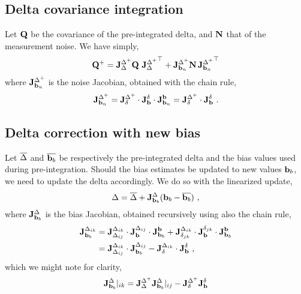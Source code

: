 \subsection{Delta covariance integration}

Let ${\bf Q}$ be the covariance of the pre-integrated delta, and ${\bf N}$ that of the measurement noise. We have simply,
%
\begin{align}
{\bf Q}^+ = {{\bf J}^{\Delta^+}_{\Delta}}{\bf Q}\,\,{{\bf J}^{\Delta^+}_{\Delta}}^{\top} + {{\bf J}^{\Delta^+}_{{\bf b}_n}}{\bf N}\,{{\bf J}^{\Delta^+}_{{\bf b}_n}}^{\top}
\end{align}
%
where ${{\bf J}^{\Delta^+}_{{\bf b}_n}}$ is the noise Jacobian, obtained with the chain rule,
%
\begin{align}
{{\bf J}^{\Delta^+}_{{\bf b}_n}} = {{\bf J}^{\Delta^+}_{\delta}} \cdot {{\bf J}^{\delta}_{{\bf b}}} \cdot {{\bf J}^{{\bf b}}_{{\bf b}_n}} = {{\bf J}^{\Delta^+}_{\delta}} \cdot {{\bf J}^{\delta}_{{\bf b}}}
~.
\end{align}


\subsection{Delta correction with new bias}

Let $\overline{\Delta}$ and $\overline{{\bf b}_b}$ be respectively the pre-integrated delta and the bias values used during pre-integration. Should the bias estimates be updated to new values ${\bf b}_b$, we need to update the delta accordingly. We do so with the linearized update,
%
\begin{align}\label{equ:delta_correction}
\Delta = \overline{\Delta} + {{\bf J}^{\Delta}_{{\bf b}_b}}({\bf b}_b - \overline{{\bf b}_b})
~,
\end{align}
%
where ${{\bf J}^{\Delta}_{{\bf b}_b}}$ is the bias Jacobian, obtained recursively using also the chain rule,
%
\begin{align*}
{{\bf J}^{\Delta_{ik}}_{{\bf b}_b}} 
&= 
{{\bf J}^{\Delta_{ik}}_{\Delta_{ij}}} \cdot {{\bf J}^{\Delta_{ij}}_{{\bf b}}} \cdot {{\bf J}^{{\bf b}}_{{\bf b}_b}} 
+ 
{{\bf J}^{\Delta_{ik}}_{\delta_{jk}}} \cdot {{\bf J}^{\delta_{jk}}_{{\bf b}}} \cdot {{\bf J}^{{\bf b}}_{{\bf b}_b}} \\
&= {{\bf J}^{\Delta_{ik}}_{\Delta_{ij}}} \cdot {{\bf J}^{\Delta_{ij}}_{{\bf b}_b}} - {{\bf J}^{\Delta_{ik}}_{\delta}} \cdot {{\bf J}^{\delta}_{{\bf b}}}
~,
\end{align*}
%
which we might note for clarity,
%
\begin{align}
{{\bf J}^{\Delta}_{{\bf b}_b}}|_{ik} = {{\bf J}^{\Delta^+}_{\Delta}}{{\bf J}^{\Delta}_{{\bf b}_b}}|_{ij} - {{\bf J}^{\Delta^+}_{\delta}}{{\bf J}^{\delta}_{{\bf b}}}
\end{align}


